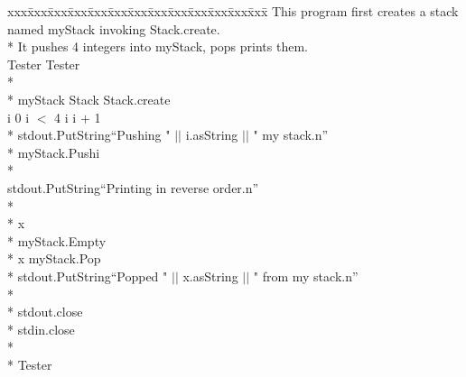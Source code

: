 {\small\it\begin{minipage}{\textwidth}\begin{tabbing}
xxx\=xxx\=xxx\=xxx\=xxx\=xxx\=xxx\=xxx\=xxx\=xxx\=xxx\=xxx\=xxx\=\+\kill%
\cd{} This program first creates a stack named myStack  invoking Stack.create.\\*{}%
\cd{} It pushes 4 integers into myStack,   pops  prints them.\\[1.0ex]{}%
 Tester \assign{}  Tester\+\\*{}%
  \+\\*{}%
     myStack\CO{} Stack \assign{} Stack.create\\[1.0ex]{}%
     i \CO{}  \assign{} 0  i $<$ 4  i \assign{} i $+$ 1\+\\*{}%
      stdout.PutString\/\LB{}``Pushing " $|$$|$ i.asString $|$$|$ "  my stack.\mybackslash{}n''\/\RB{}\\*{}%
      myStack.Push\/\LB{}i\/\RB{}\-\\*{}%
     \\[1.0ex]{}%
    stdout.PutString\/\LB{}``Printing in reverse order.\mybackslash{}n''\/\RB{}\\*{}%
    \+\\*{}%
       x\CO{} \\*{}%
        myStack.Empty\\*{}%
      x \assign{} myStack.Pop\\*{}%
      stdout.PutString\/\LB{}``Popped " $|$$|$ x.asString $|$$|$ " from my stack.\mybackslash{}n''\/\RB{}\-\\*{}%
     \\*{}%
    stdout.close\\*{}%
    stdin.close\-\\*{}%
   \-\\*{}%
 Tester
\end{tabbing}\end{minipage}}
